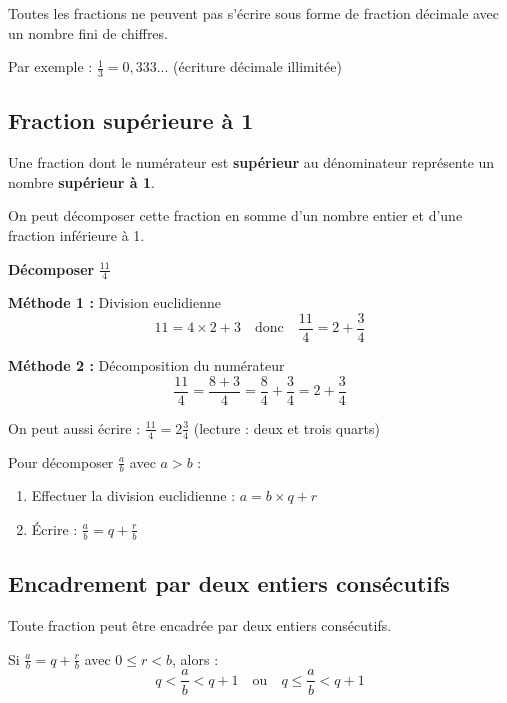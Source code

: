 \begin{remarkbox}
	Toutes les fractions ne peuvent pas s'écrire sous forme de fraction décimale avec un nombre fini de chiffres. 
	
	Par exemple : $\frac{1}{3} = 0,333...$ (écriture décimale illimitée)
\end{remarkbox}

\subsection{Fraction supérieure à 1}

\begin{definitionbox}
	Une fraction dont le numérateur est \textbf{supérieur} au dénominateur représente un nombre \textbf{supérieur à 1}.
	
	On peut décomposer cette fraction en somme d'un nombre entier et d'une fraction inférieure à 1.
\end{definitionbox}

\begin{examplebox}
	\textbf{Décomposer} $\frac{11}{4}$
	
	\textbf{Méthode 1 :} Division euclidienne
	$$11 = 4 \times 2 + 3 \quad \text{donc} \quad \frac{11}{4} = 2 + \frac{3}{4}$$
	
	\textbf{Méthode 2 :} Décomposition du numérateur
	$$\frac{11}{4} = \frac{8 + 3}{4} = \frac{8}{4} + \frac{3}{4} = 2 + \frac{3}{4}$$
	
	On peut aussi écrire : $\frac{11}{4} = 2\frac{3}{4}$ (lecture : deux et trois quarts)
\end{examplebox}

\begin{methodebox}
	Pour décomposer $\frac{a}{b}$ avec $a > b$ :
	\begin{enumerate}
		\item Effectuer la division euclidienne : $a = b \times q + r$
		\item Écrire : $\frac{a}{b} = q + \frac{r}{b}$
	\end{enumerate}
\end{methodebox}

\subsection{Encadrement par deux entiers consécutifs}

\begin{proprietebox}
	Toute fraction peut être encadrée par deux entiers consécutifs.
	
	Si $\frac{a}{b} = q + \frac{r}{b}$ avec $0 \leq r < b$, alors :
	$$q < \frac{a}{b} < q+1 \quad \text{ou} \quad q \leq \frac{a}{b} < q+1$$
\end{proprietebox}

